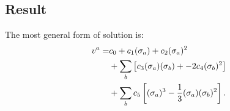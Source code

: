 \documentclass[aps,prd,final,twocolumn,floats,floatfix,nofootinbib,10pt]{revtex4-1}
\begin{document}
\subsection{Result}

The most general form of solution is:
\begin{align}
  v^a = & c_0 + c_1 (\sigma_a) + c_2 (\sigma_a)^2 \notag \\
        & + \sum_b \left[ c_3 (\sigma_a) (\sigma_b) + -2 c_4 (\sigma_b)^2
          \right] \notag \\
        & + \sum_b c_5 \left[
          (\sigma_a)^3 - \frac{1}{3} (\sigma_a) (\sigma_b)^2 \right].
\end{align}
\end{document}
